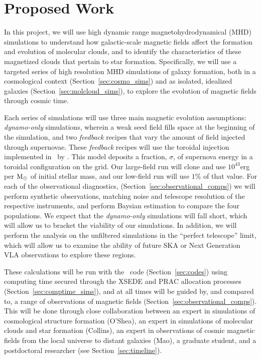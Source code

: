 \vspace{-4mm}
\section{Proposed Work}
\vspace{-3mm}

In this project, we will use high dynamic range magnetohydrodynamical
(MHD) simulations to understand how galactic-scale magnetic fields
affect the formation and evolution of molecular clouds, and to
identify the characteristics of these magnetized clouds that pertain
to star formation.  Specifically, we will use a targeted series of
high resolution MHD simulations of galaxy formation, both in a
cosmological context (Section~\ref{sec:cosmo_sims}) and as isolated, idealized
galaxies (Section~\ref{sec:molcloud_sims}), to explore the evolution
of magnetic fields through cosmic time.  

Each series of simulations will use
three main magnetic evolution assumptions: \emph{dynamo-only}  simulations,
wherein a weak seed field fills space at the beginning of the simulation, and
two \emph{feedback} recipes that vary the amount of field injected through
supernovae.  These \emph{feedback} recipes will use the toroidal injection
implemented in \enzo\ by \citet{Butsky17}.  This model deposits a fraction,
$\sigma$, of supernova energy in a toroidal configuration on the grid.  Our
large-field run will clone \citep{Butsky17} and use
 $10^{43}$erg per $\rm{M}_\odot$ of initial
stellar mass, and our low-field run will use $1\%$ of that value.  For each of
the observational diagnostics,
(Section~\ref{sec:observational_comps}) we will perform synthetic observations,
matching noise and telescope resolution of the respective instruments, and
perform Baysian estimation to compare the four populations.  We expect that the
\emph{dynamo-only} simulations will fall short, which will allow us to bracket
the viability of our simulations.  In addition, we will perform the analysis on
the unfiltered simulations in the ``perfect telescope'' limit, which will allow
us to examine the ability of future SKA or Next Generation VLA observations to
explore these regions.

These calculations will be run with the \enzo\ code
(Section~\ref{sec:codes}) using computing time secured through the
XSEDE and PRAC allocation processes (Section~\ref{sec:comptime_sims}), and at all
times will be guided by, and compared to, a range of observations of
magnetic fields (Section~\ref{sec:observational_comps}).  This will be
done through close collaboration between an expert in simulations of
cosmological structure formation (O'Shea), an expert in simulations of
molecular clouds and star formation (Collins), an expert in
observations of cosmic magnetic fields from the local universe to
distant galaxies (Mao), a graduate
student, and a postdoctoral researcher (see Section~\ref{sec:timeline}).



